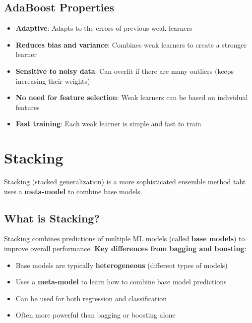 \documentclass[a4paper]{article}
\theoremstyle{definition}
\begin{document}
\subsection{AdaBoost Properties}
\begin{itemize}
    \item \textbf{Adaptive}: Adapts to the errors of previous weak learners 
    \item \textbf{Reduces bias and variance}: Combines weak learners to create a stronger learner 
    \item \textbf{Sensitive to noisy data}: Can overfit if there are many outliers (keeps increasing their weights)
    \item \textbf{No need for feature selection}: Weak learners can be based on individual features 
    \item \textbf{Fast training}: Each weak learner is simple and fast to train
\end{itemize}
\section{Stacking}
Stacking (stacked generalization) is a more sophisticated ensemble method taht uses a \textbf{meta-model} to combine base models.
\subsection{What is Stacking?}
Stacking combines predictions of multiple ML models (called \textbf{base models}) to improve overall performance.
\vspace{1em}
\noindent
\newline
\textbf{Key differences from bagging and boosting}:
\begin{itemize}
    \item Base models are typically \textbf{heterogeneous} (different types of models)
    \item Uses a \textbf{meta-model} to learn how to combine base model predictions 
    \item Can be used for both regression and classification 
    \item Often more powerful than bagging or boosting alone
\end{itemize}
\end{document}
